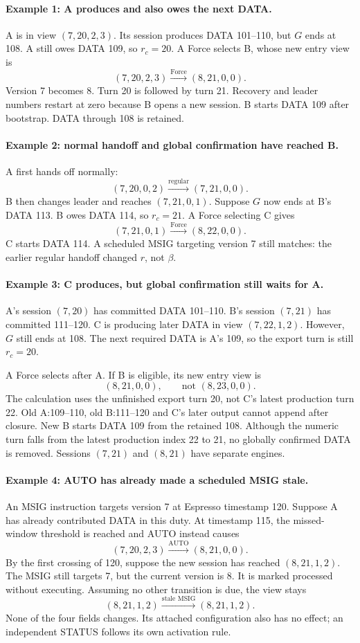 \documentclass[11pt,a4paper]{article}
\begin{document}
\paragraph{Example 1: A produces and also owes the next DATA.}
A is in view $(7,20,2,3)$. Its session produces DATA 101--110,
but $G$ ends at 108. A still owes DATA 109, so $r_c=20$.
A Force selects B, whose new entry view is
\[
 (7,20,2,3)\xrightarrow{\text{Force}}(8,21,0,0).
\]
Version 7 becomes 8. Turn 20 is followed by turn 21. Recovery and
leader numbers restart at zero because B opens a new session.
B starts DATA 109 after bootstrap. DATA through 108 is retained.

\paragraph{Example 2: normal handoff and global confirmation have reached B.}
A first hands off normally:
\[
 (7,20,0,2)\xrightarrow{\text{regular}}(7,21,0,0).
\]
B then changes leader and reaches $(7,21,0,1)$. Suppose $G$ now ends
at B's DATA 113. B owes DATA 114, so $r_c=21$. A Force selecting C gives
\[
 (7,21,0,1)\xrightarrow{\text{Force}}(8,22,0,0).
\]
C starts DATA 114. A scheduled MSIG targeting version 7 still matches:
the earlier regular handoff changed $r$, not $\beta$.

\paragraph{Example 3: C produces, but global confirmation still waits for A.}
A's session $(7,20)$ has committed DATA 101--110. B's session
$(7,21)$ has committed 111--120. C is producing later DATA in view
$(7,22,1,2)$. However, $G$ still ends at 108. The next required DATA
is A's 109, so the export turn is still $r_c=20$.

A Force selects after A. If B is eligible, its new entry view is
\[
 (8,21,0,0),\qquad\text{not }(8,23,0,0).
\]
The calculation uses the unfinished export turn 20, not C's latest
production turn 22. Old A:109--110, old B:111--120 and C's later output
cannot append after closure. New B starts DATA 109 from the retained 108.
Although the numeric turn falls from the latest production index 22 to
21, no globally confirmed DATA is removed. Sessions $(7,21)$ and
$(8,21)$ have separate engines.

\paragraph{Example 4: AUTO has already made a scheduled MSIG stale.}
An MSIG instruction targets version 7 at Espresso timestamp 120.
Suppose A has already contributed DATA in this duty. At timestamp
115, the missed-window threshold is reached and AUTO instead causes
\[
 (7,20,2,3)\xrightarrow{\text{AUTO}}(8,21,0,0).
\]
By the first crossing of 120, suppose the new session has reached
$(8,21,1,2)$. The MSIG still targets 7, but the current version is 8.
It is marked processed without executing. Assuming no other transition
is due, the view stays
\[
 (8,21,1,2)\xrightarrow{\text{stale MSIG}}(8,21,1,2).
\]
None of the four fields changes. Its attached configuration also has
no effect; an independent STATUS follows its own activation rule.
\end{document}
